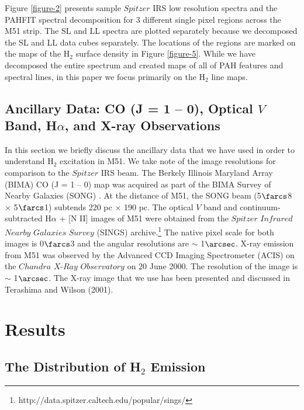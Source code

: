 \documentclass[12pt,preprint]{aastex}
\begin{document}
Figure \ref{figure-2} presents sample $Spitzer$ IRS low resolution 
spectra and the PAHFIT spectral decomposition for 3 different 
single pixel regions across the M51 strip.  The SL and LL spectra 
are plotted separately because we decomposed the SL and LL 
data cubes separately.  The locations of the regions are 
marked on the maps of the H$_2$ surface density in Figure \ref{figure-5}.  
While we have decomposed the entire spectrum and created maps of all of 
PAH features and spectral lines, in this paper we focus primarily 
on the H$_2$ line maps.

 
\subsection{Ancillary Data: CO (J = 1 -- 0), Optical $V$ Band, H$\alpha$, and X-ray Observations}

In this section we briefly discuss the ancillary data that we 
have used in order to understand H$_2$ excitation in M51.  
We take note of the image resolutions for comparison to the
$Spitzer$ IRS beam.  The Berkely Illinois Maryland Array (BIMA) CO (J = 1 -- 0) map was
acquired as part of the BIMA Survey of Nearby Galaxies (SONG)
\citep{reg01, hel03}.  At the distance of M51, the SONG beam
(5$\farcs$8 $\times$ 5$\farcs$1) subtends 220 pc $\times$ 190 pc.  
The optical $V$ band and continuum-subtracted H$\alpha$ + [N II] images of M51 were obtained from the $Spitzer$ $Infrared$ $Nearby$ $Galaxies$ $Survey$ (SINGS) archive.\footnote{http://data.spitzer.caltech.edu/popular/sings/} 
The native pixel scale for both images is 0$\farcs$3 
and the angular resolutions are $\sim$ 1$\arcsec$.  X-ray 
emission from M51 was observed by the Advanced CCD 
Imaging Spectrometer (ACIS) on the $Chandra$ $X$-$Ray$ 
$Observatory$ on 20 June 2000.  The resolution of 
the image is $\sim$ 1$\arcsec$.  The X-ray image that 
we use has been presented and discussed in 
Terashima and Wilson (2001).

\section{Results}

\subsection{The Distribution of H$_2$ Emission}
\end{document}
